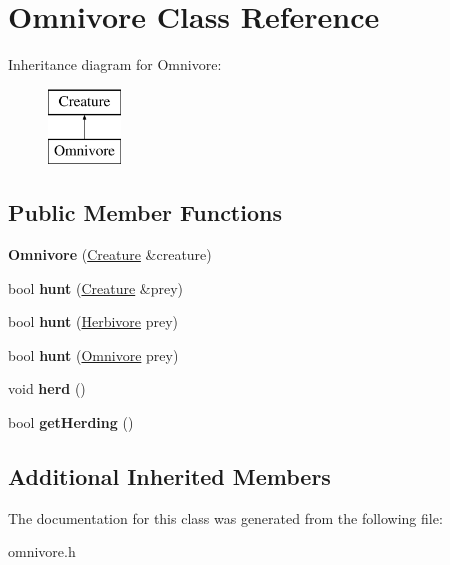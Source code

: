 \hypertarget{class_omnivore}{}\section{Omnivore Class Reference}
\label{class_omnivore}
Inheritance diagram for Omnivore\+:\begin{figure}[H]
\begin{center}
\leavevmode
\includegraphics[height=2.000000cm]{class_omnivore}
\end{center}
\end{figure}
\subsection*{Public Member Functions}
\begin{DoxyCompactItemize}
\item 
\mbox{\label{class_omnivore_ad8ddc3f954b778f6a628c19c0fa6d6c9}} 
{\bfseries Omnivore} (\hyperlink{class_creature}{Creature} \&creature)
\item 
\mbox{\label{class_omnivore_a24b519d8b584fa889241e0eb8d666b2e}} 
bool {\bfseries hunt} (\hyperlink{class_creature}{Creature} \&prey)
\item 
\mbox{\label{class_omnivore_a9e962a0697c4d09297c8edffce538b3e}} 
bool {\bfseries hunt} (\hyperlink{class_herbivore}{Herbivore} prey)
\item 
\mbox{\label{class_omnivore_a27a01e0439cff6ace454a11a0e9a4fe0}} 
bool {\bfseries hunt} (\hyperlink{class_omnivore}{Omnivore} prey)
\item 
\mbox{\label{class_omnivore_ab6a1b337eb581e9484435cfabbbb2b57}} 
void {\bfseries herd} ()
\item 
\mbox{\label{class_omnivore_a32a33697de9a2e666a38a3ce69f6f803}} 
bool {\bfseries get\+Herding} ()
\end{DoxyCompactItemize}
\subsection*{Additional Inherited Members}


The documentation for this class was generated from the following file\+:\begin{DoxyCompactItemize}
\item 
omnivore.\+h\end{DoxyCompactItemize}
